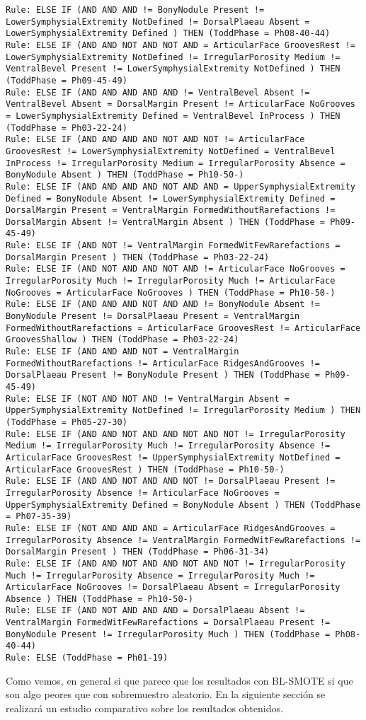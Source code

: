 \begin{lstlisting}
Rule: ELSE IF (AND AND AND != BonyNodule Present != LowerSymphysialExtremity NotDefined != DorsalPlaeau Absent = LowerSymphysialExtremity Defined ) THEN (ToddPhase = Ph08-40-44)
Rule: ELSE IF (AND AND NOT AND NOT AND = ArticularFace GroovesRest != LowerSymphysialExtremity NotDefined != IrregularPorosity Medium != VentralBevel Present != LowerSymphysialExtremity NotDefined ) THEN (ToddPhase = Ph09-45-49)
Rule: ELSE IF (AND AND AND AND AND != VentralBevel Absent != VentralBevel Absent = DorsalMargin Present != ArticularFace NoGrooves = LowerSymphysialExtremity Defined = VentralBevel InProcess ) THEN (ToddPhase = Ph03-22-24)
Rule: ELSE IF (AND AND AND AND NOT AND NOT != ArticularFace GroovesRest != LowerSymphysialExtremity NotDefined = VentralBevel InProcess != IrregularPorosity Medium = IrregularPorosity Absence = BonyNodule Absent ) THEN (ToddPhase = Ph10-50-)
Rule: ELSE IF (AND AND AND AND NOT AND AND = UpperSymphysialExtremity Defined = BonyNodule Absent != LowerSymphysialExtremity Defined = DorsalMargin Present = VentralMargin FormedWithoutRarefactions != DorsalMargin Absent != VentralMargin Absent ) THEN (ToddPhase = Ph09-45-49)
Rule: ELSE IF (AND NOT != VentralMargin FormedWitFewRarefactions = DorsalMargin Present ) THEN (ToddPhase = Ph03-22-24)
Rule: ELSE IF (AND NOT AND AND NOT AND != ArticularFace NoGrooves = IrregularPorosity Much != IrregularPorosity Much != ArticularFace NoGrooves = ArticularFace NoGrooves ) THEN (ToddPhase = Ph10-50-)
Rule: ELSE IF (AND AND AND NOT AND AND != BonyNodule Absent != BonyNodule Present != DorsalPlaeau Present = VentralMargin FormedWithoutRarefactions = ArticularFace GroovesRest != ArticularFace GroovesShallow ) THEN (ToddPhase = Ph03-22-24)
Rule: ELSE IF (AND AND AND NOT = VentralMargin FormedWithoutRarefactions != ArticularFace RidgesAndGrooves != DorsalPlaeau Present != BonyNodule Present ) THEN (ToddPhase = Ph09-45-49)
Rule: ELSE IF (NOT AND NOT AND != VentralMargin Absent = UpperSymphysialExtremity NotDefined != IrregularPorosity Medium ) THEN (ToddPhase = Ph05-27-30)
Rule: ELSE IF (AND AND NOT AND AND NOT AND NOT != IrregularPorosity Medium != IrregularPorosity Much != IrregularPorosity Absence != ArticularFace GroovesRest != UpperSymphysialExtremity NotDefined = ArticularFace GroovesRest ) THEN (ToddPhase = Ph10-50-)
Rule: ELSE IF (AND AND NOT AND AND NOT != DorsalPlaeau Present != IrregularPorosity Absence != ArticularFace NoGrooves = UpperSymphysialExtremity Defined = BonyNodule Absent ) THEN (ToddPhase = Ph07-35-39)
Rule: ELSE IF (NOT AND AND AND = ArticularFace RidgesAndGrooves = IrregularPorosity Absence != VentralMargin FormedWitFewRarefactions != DorsalMargin Present ) THEN (ToddPhase = Ph06-31-34)
Rule: ELSE IF (AND AND NOT AND AND NOT AND NOT != IrregularPorosity Much != IrregularPorosity Absence = IrregularPorosity Much != ArticularFace NoGrooves != DorsalPlaeau Absent = IrregularPorosity Absence ) THEN (ToddPhase = Ph10-50-)
Rule: ELSE IF (AND NOT AND AND AND = DorsalPlaeau Absent != VentralMargin FormedWitFewRarefactions = DorsalPlaeau Present != BonyNodule Present != IrregularPorosity Much ) THEN (ToddPhase = Ph08-40-44)
Rule: ELSE (ToddPhase = Ph01-19)
\end{lstlisting}


Como vemos, en general si que parece que los resultados con BL-SMOTE si que son algo peores que con sobremuestro aleatorio. En la siguiente sección se realizará un estudio comparativo sobre los resultados obtenidos.


\newpage
